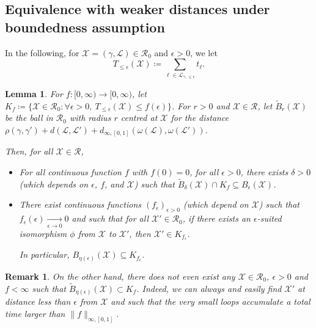 \documentclass[11pt]{article}
\newtheorem{lemma}[theorem]{Lemma}
\newtheorem{remark}[theorem]{Remark}
\def\Conf{{\mathscr{R}}}
\begin{document}
\subsection{Equivalence with weaker distances under boundedness assumption}
\label{sub:weak}
In the following, for $\mathcal{X}=(\gamma,\mathcal{L})\in \Conf_0$ and $\epsilon >0$, we let 
\begin{equation}
\label{eq:def:Tleqepsilon}
T_{\leq \epsilon}(\mathcal{X})\coloneqq \sum_{\ell \in \mathcal{L}_{\gamma,\leq \epsilon}} t_\ell.
\end{equation}
\begin{lemma}
  \label{le:Tbound}
  For $f:[0,\infty)\to [0,\infty)$, let $K_f\coloneqq\{ \mathcal{X}\in \Conf_0: \forall \epsilon>0, \ T_{\leq \epsilon}(\mathcal{X})\leq f(\epsilon)\}$.
  For $r>0$ and $\mathcal{X}\in\Conf$, let $\tilde{B}_{r}(\mathcal{X})$ be the ball in $\Conf_0$ with radius $r$ centred at $\mathcal{X}$ for the distance $\rho(\gamma,\gamma')+  d( \mathcal{L},\mathcal{L}'  )+d_{\infty,[0,1]}(\omega(\mathcal{L}),\omega(\mathcal{L}') )$.

  Then, for all $\mathcal{X}\in\Conf$,
  \begin{itemize}
  \item For all continuous function $f$ with $f(0)=0$, for all $\epsilon>0$, there exists $\delta>0$ (which depends on $\epsilon$, $f$, and $\mathcal{X}$)
  such that $\tilde{B}_{\delta}(\mathcal{X})\cap K_f\subseteq B_\epsilon(\mathcal{X})$.
  \item There exist continuous functions $(f_\epsilon)_{\epsilon>0}$ (which depend on $\mathcal{X}$) such that $f_\epsilon(\epsilon)\underset{\epsilon\to 0}\longrightarrow 0$ and such that
  for all $\mathcal{X}'\in \Conf_0$, if there exists an $\epsilon$-suited isomorphism $\phi$ from $\mathcal{X}$ to $\mathcal{X}'$, then $\mathcal{X}'\in  K_{f_\epsilon} $.

  In particular, $B_{\eta(\epsilon)} (\mathcal{X})\subseteq K_{f_\epsilon} $.
  \end{itemize}
\end{lemma}
\begin{remark}
  On the other hand, there does not even exist any $\mathcal{X}\in \Conf_0$, $\epsilon>0$ and $f<\infty$ such that $\tilde{B}_{\eta(\epsilon)}(\mathcal{X})\subset K_f$.  Indeed, we can always and easily find $\mathcal{X}'$ at distance less than $\epsilon$ from $\mathcal{X}$ and such that the very small loops accumulate a total time larger than $\|f\|_{\infty,[0,1]}$.
\end{remark}
\end{document}
